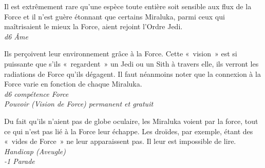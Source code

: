 \begin{description}[align=left]
\item [Sensibilité raciale à la force] 	%
		Il est extrêmement rare qu’une espèce toute entière soit sensible aux flux de la Force et il n’est guère étonnant que certains Miraluka, parmi ceux qui maîtrisaient le mieux la Force, aient rejoint l’Ordre Jedi.\\
		\textit{d6 \^Ame}

\item [Vision de force] 			%
		Ils perçoivent leur environnement grâce à la Force. Cette «~vision~» est si puissante que s’ils «~regardent~» un Jedi ou un Sith à travers elle, ils verront les radiations de Force qu’ils dégagent. Il faut néanmoins noter que la connexion à la Force varie en fonction de chaque Miraluka.\\
		\textit{d6 compétence Force}\\
		\textit{Pouvoir (Vision de Force) permanent et gratuit}

\item [Aveugle dans la lumière] 	%
		Du fait qu’ils n’aient pas de globe oculaire, les Miraluka voient par la force, tout ce qui n’est pas lié à la Force leur échappe. Les droïdes, par exemple, étant des «~vides de Force~» ne leur apparaissent pas. Il leur est impossible de lire.\\
		\textit{Handicap (Aveugle)}\\
		\textit{-1 Parade}
\end{description}